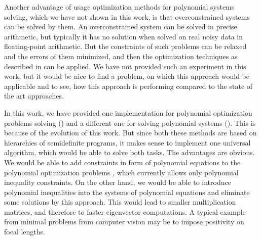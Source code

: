 Another advantage of usage optimization methods for polynomial systems solving, which we have not shown in this work, is that overconstrained systems can be solved by them.
An overconstrained system can be solved in precise arithmetic, but typically it has no solution when solved on real noisy data in floating-point arithmetic.
But the constraints of such problems can be relaxed and the errors of them minimized, and then the optimization techniques as described in  can be applied.
We have not provided such an experiment in this work, but it would be nice to find a problem, on which this approach would be applicable and to see, how this approach is performing compared to the state of the art approaches.

In this work, we have provided one implementation for polynomial optimization problems solving () and a different one for solving polynomial systems ().
This is because of the evolution of this work.
But since both these methods are based on hierarchies of semidefinite programs, it makes sense to implement one universal algorithm, which would be able to solve both tasks.
The advantages are obvious.
We would be able to add constraints in form of polynomial equations to the polynomial optimization problems , which currently allows only polynomial inequality constraints.
On the other hand, we would be able to introduce polynomial inequalities into the systems of polynomial equations and eliminate some solutions by this approach.
This would lead to smaller multiplication matrices, and therefore to faster eigenvector computations.
A typical example from minimal problems from computer vision may be to impose positivity on focal lengths.
